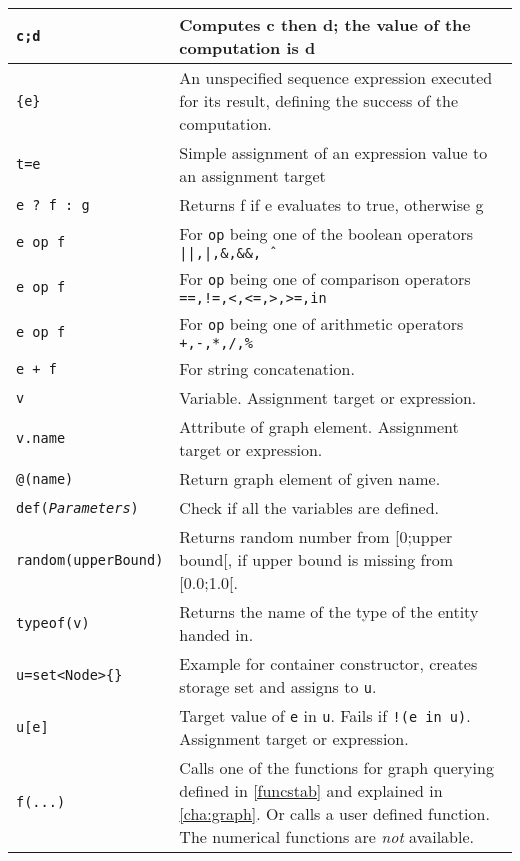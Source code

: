 \begin{table}[htbp]
\begin{minipage}{\linewidth} \renewcommand{\footnoterule}{} 
\begin{tabularx}{\linewidth}{|lX|}
\hline
\texttt{c;d}	& Computes c then d; the value of the computation is d\\
\hline
\texttt{\{e\}} & An unspecified sequence expression executed for its result, defining the success of the computation.\\
\hline
\texttt{t=e}	& Simple assignment of an expression value to an assignment target\\
\hline
\texttt{e ? f : g}	& Returns f if e evaluates to true, otherwise g \\
\texttt{e op f}	& For \texttt{op} being one of the boolean operators \texttt{||,|,\&,\&\&,\^\ } \\
\texttt{e op f}	& For \texttt{op} being one of comparison operators \texttt{==,!=,<,<=,>,>=,in} \\
\texttt{e op f}	& For \texttt{op} being one of arithmetic operators \texttt{+,-,*,/,\%} \\
\texttt{e + f}	& For string concatenation. \\
\hline
\texttt{v} & Variable. Assignment target or expression.\\
\texttt{v.name} & Attribute of graph element. Assignment target or expression.\\
\texttt{@(name)} & Return graph element of given name.\\
\texttt{def(\emph{Parameters})} & Check if all the variables are defined.\\
\texttt{random(upperBound)} & Returns random number from [0;upper bound[, if upper bound is missing from [0.0;1.0[.\\
\texttt{typeof(v)} & Returns the name of the type of the entity handed in.\\
\hline
\texttt{u=set<Node>\{\}}	& Example for container constructor, creates storage set and assigns to \texttt{u}.\\
\texttt{u[e]}	& Target value of \texttt{e} in \texttt{u}. Fails if \texttt{!(e in u)}. Assignment target or expression.\\
\hline
\texttt{f(...)}	& Calls one of the functions for graph querying defined in \ref{funcstab} and explained in \ref{cha:graph}. Or calls a user defined function. The numerical functions are \emph{not} available.\\

\end{tabularx}
\end{minipage}
\end{table}
